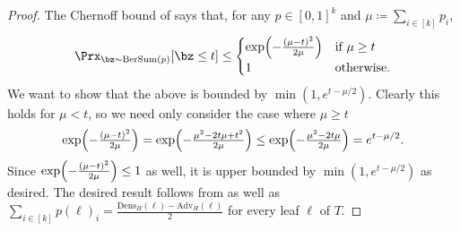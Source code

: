 \documentclass[11pt]{article}
\newcommand{\BerSum}{\mathrm{BerSum}}
\newcommand{\Dens}{\mathrm{Dens}}
\newcommand{\Adv}{\mathrm{Adv}}
\DeclarePairedDelimiter\paren{(}{)}
\begin{document}
\begin{proof}
    The Chernoff bound of  says that, for any $p \in [0,1]^k$ and $\mu \coloneqq \sum_{i \in [k]} p_i$,
    \begin{equation*}
        \Prx_{\bz \sim \BerSum(p)}[\bz \leq t] \leq \begin{cases}
            \exp\paren*{-\frac{(\mu - t)^2}{2\mu}}&\text{if }\mu \geq t \\
            1& \text{otherwise.}
        \end{cases}
    \end{equation*}
    We want to show that the above is bounded by $\min(1, e^{t- \mu/2})$. Clearly this holds for $\mu < t$, so we need only consider the case where $\mu \geq t$
    \begin{equation*}
         \exp\paren*{-\tfrac{(\mu - t)^2}{2\mu}} = \exp\paren*{-\tfrac{\mu^2 - 2t\mu + t^2}{2\mu}} \leq \exp\paren*{-\tfrac{\mu^2 - 2t\mu}{2\mu}} = e^{t - \mu/2}.
    \end{equation*}
    Since $ \exp\paren*{-\frac{(\mu - t)^2}{2\mu}} \leq 1$ as well, it is upper bounded by $\min(1, e^{t- \mu/2})$ as desired. The desired result follows from  as well as $\sum_{i \in [k]} p(\ell)_i = \frac{\Dens_H(\ell) - \Adv_H(\ell)}{2}$ for every leaf $\ell$ of $T$.
\end{proof}
\end{document}
